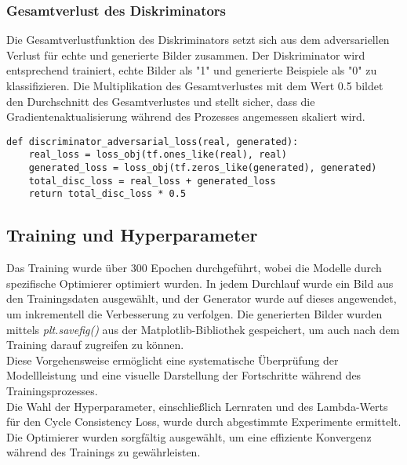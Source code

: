 \subsubsection{Gesamtverlust des Diskriminators}
Die Gesamtverlustfunktion des Diskriminators setzt sich aus dem adversariellen Verlust für echte und generierte Bilder zusammen. Der Diskriminator wird entsprechend trainiert, echte Bilder als "1" und generierte Beispiele als "0" zu klassifizieren. Die Multiplikation des Gesamtverlustes mit dem Wert 0.5 bildet den Durchschnitt des Gesamtverlustes und stellt sicher, dass die Gradientenaktualisierung während des Prozesses angemessen skaliert wird.

\begin{lstlisting}[language=pyhaff, caption={Vorverarbeitung des Datensatzes: Jittering}, label={cod:cycleGanDiscriminator}]
def discriminator_adversarial_loss(real, generated):
    real_loss = loss_obj(tf.ones_like(real), real)
    generated_loss = loss_obj(tf.zeros_like(generated), generated)
    total_disc_loss = real_loss + generated_loss
    return total_disc_loss * 0.5
\end{lstlisting}

\subsection{Training und Hyperparameter}
Das Training wurde über 300 Epochen durchgeführt, wobei die Modelle durch spezifische Optimierer optimiert wurden. In jedem Durchlauf wurde ein Bild aus den Trainingsdaten ausgewählt, und der Generator wurde auf dieses angewendet, um inkrementell die Verbesserung zu verfolgen. Die generierten Bilder wurden mittels \textit{plt.savefig()} aus der Matplotlib-Bibliothek gespeichert, um auch nach dem Training darauf zugreifen zu können.\\
Diese Vorgehensweise ermöglicht eine systematische Überprüfung der Modellleistung und eine visuelle Darstellung der Fortschritte während des Trainingsprozesses.
\\
Die Wahl der Hyperparameter, einschließlich Lernraten und des Lambda-Werts für den Cycle Consistency Loss, wurde durch abgestimmte Experimente ermittelt. Die Optimierer wurden sorgfältig ausgewählt, um eine effiziente Konvergenz während des Trainings zu gewährleisten.




